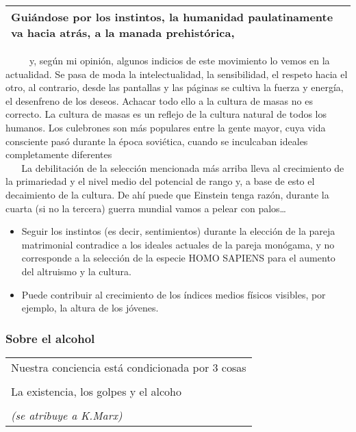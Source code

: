 \begin{longtable}[]{@{}l@{}}
\toprule
Guiándose por los instintos, la humanidad paulatinamente va hacia atrás,
a la manada prehistórica,\tabularnewline
\bottomrule
\end{longtable}

~ ~ ~ y, según mi opinión, algunos indicios de este movimiento lo vemos
en la actualidad. Se pasa de moda la intelectualidad, la sensibilidad,
el respeto hacia el otro, al contrario, desde las pantallas y las
páginas se cultiva la fuerza y energía, el desenfreno de los deseos.
Achacar todo ello a la cultura de masas no es correcto. La cultura de
masas es un reflejo de la cultura natural de todos los humanos. Los
culebrones son más populares entre la gente mayor, cuya vida consciente
pasó durante la época soviética, cuando se inculcaban ideales
completamente diferentes\\
\hspace*{0.333em} ~ ~ La debilitación de la selección mencionada más
arriba lleva al crecimiento de la primariedad y el nivel medio del
potencial de rango y, a base de esto el decaimiento de la cultura. De
ahí puede que Einstein tenga razón, durante la cuarta (si no la tercera)
guerra mundial vamos a pelear con palos\ldots{}

\begin{itemize}
\tightlist
\item
  Seguir los instintos (es decir, sentimientos) durante la elección de
  la pareja matrimonial contradice a los ideales actuales de la pareja
  monógama, y no corresponde a la selección de la especie HOMO SAPIENS
  para el aumento del altruismo y la cultura.
\item
  Puede contribuir al crecimiento de los índices medios físicos
  visibles, por ejemplo, la altura de los jóvenes.
\end{itemize}

\protect\hypertarget{M12}{}{}

\hypertarget{sobre-el-alcohol}{\subsubsection{Sobre el
alcohol}\label{sobre-el-alcohol}}

\begin{longtable}[]{@{}l@{}}
\toprule
Nuestra conciencia está condicionada por 3 cosas\tabularnewline
\tabularnewline
La existencia, los golpes y el alcoho\tabularnewline
\tabularnewline
\emph{(se atribuye a K.Marx)}\tabularnewline
\bottomrule
\end{longtable}

